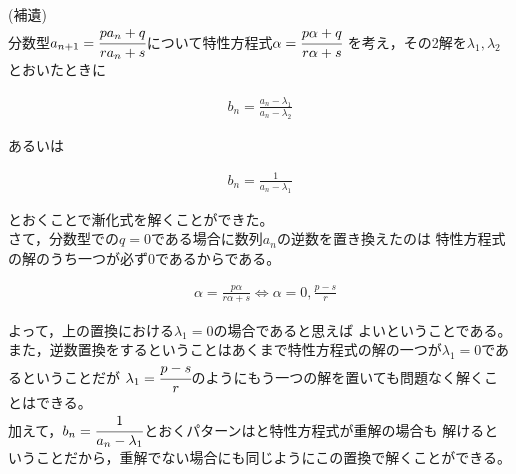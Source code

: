 \documentclass[autodetect-engine,ja=standard, 10.5pt, a4paper, titlepage]{bxjsarticle}
\begin{document}
\begin{enumerate}[1.]
\baselineskip
        \noindent(補遺) \\
        分数型$a_{n+1} = \cfrac{pa_n + q}{ra_n + s}$について特性方程式$\alpha = \cfrac{p\alpha + q}{r\alpha + s}$
        を考え，その2解を$\lambda_1,\lambda_2$とおいたときに
          \begin{fleqn}[20pt]
            \begin{align*}
              b_n = \frac{a_n - \lambda_1}{a_n - \lambda_2}
            \end{align*}
          \end{fleqn}
        あるいは
          \begin{fleqn}[20pt]
            \begin{align*}
              b_n = \frac{1}{a_n - \lambda_1}
            \end{align*}
          \end{fleqn}
        とおくことで漸化式を解くことができた。 \\
        さて，分数型での$q=0$である場合に数列$a_n$の逆数を置き換えたのは
        特性方程式の解のうち一つが必ず$0$であるからである。
          \begin{fleqn}[20pt]
            \begin{align*}
              &\alpha = \frac{p\alpha}{r\alpha + s} \Leftrightarrow \alpha = 0,\frac{p-s}{r}
            \end{align*}
          \end{fleqn}
        よって，上の置換における$\lambda_1 = 0$の場合であると思えば
        よいということである。
        また，逆数置換をするということはあくまで特性方程式の解の一つが$\lambda_1=0$であるということだが
        $\lambda_1 = \cfrac{p-s}{r}$のようにもう一つの解を置いても問題なく解くことはできる。 \\
        加えて，$b_n = \cfrac{1}{a_n - \lambda_1}$とおくパターンはと特性方程式が重解の場合も
        解けるということだから，重解でない場合にも同じようにこの置換で解くことができる。


\end{enumerate}
\end{document}
